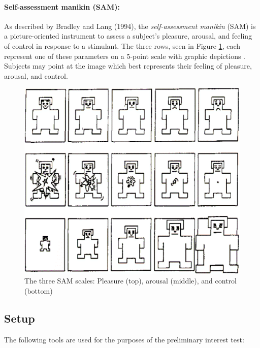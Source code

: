 \paragraph{Self-assessment manikin (SAM):} As described by Bradley and Lang (1994), the \textit{self-assessment manikin} (SAM) is a picture-oriented instrument to assess a subject’s pleasure, arousal, and feeling of control in response to a stimulant. The three rows, seen in Figure \ref{fig:SAM}, each represent one of these parameters on a 5-point scale with graphic depictions \cite{Bradley1994}. Subjects may point at the image which best represents their feeling of pleasure, arousal, and control.

\begin{figure}[h!]
    \centering
    \includegraphics[width=\textwidth]{figures/SAM.png}
    \caption{The three SAM scales: Pleasure (top), arousal (middle), and control (bottom) \cite{Bradley1994}}\label{fig:SAM}
\end{figure}

\pagebreak

\subsection{Setup}
The following tools are used for the purposes of the preliminary interest test:

